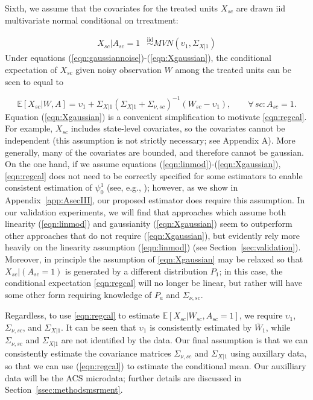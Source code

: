 \documentclass[aoas]{imsart}
\theoremstyle{plain}
\theoremstyle{remark}
\begin{document}
Sixth, we assume that the covariates for the treated units $X_{sc}$ are drawn iid multivariate normal conditional on trreatment:

\begin{align} \label{eqn:Xgaussian}
    X_{sc}|A_{sc} = 1 & \stackrel{\text{iid}}{\sim} MVN(\upsilon_1, \Sigma_{X|1})%
\end{align}
%
Under equations (\ref{eqn:gaussiannoise})-(\ref{eqn:Xgaussian}), the conditional expectation of $X_{sc}$ given noisy observation $W$ among the treated units can be seen to equal to

\begin{equation} \label{eqn:regcal}
\mathbb{E}[X_{sc}| W, A] = \upsilon_1 + \Sigma_{X|1} \left(\Sigma_{X|1} + \Sigma_{\nu, sc}\right)^{-1}  (W_{sc} - \upsilon_1), \qquad \forall\, sc: A_{sc} = 1.
\end{equation}
%
Equation (\ref{eqn:Xgaussian}) is a convenient simplification to motivate \eqref{eqn:regcal}. For example, $X_{sc}$ includes state-level covariates, so the covariates cannot be independent (this assumption is not strictly necessary; see Appendix A). More generally, many of the covariates are bounded, and therefore cannot be gaussian. On the one hand, if we assume equations (\ref{eqn:linmod})-(\ref{eqn:Xgaussian}), \eqref{eqn:regcal} does not need to be correctly specified for some estimators to enable consistent estimation of $\psi_0^1$ (see, e.g., \cite{gleser1992importance}); however, as we show in Appendix~\ref{app:AsecIII}, our proposed estimator does require this assumption. In our validation experiments, we will find that approaches which assume both linearity (\ref{eqn:linmod}) and gaussianity (\ref{eqn:Xgaussian}) seem to outperform other approaches that do not require (\ref{eqn:Xgaussian}), but evidently rely more heavily on the linearity assumption (\ref{eqn:linmod}) (see Section~\ref{sec:validation}). Moreover, in principle the assumption of \eqref{eqn:Xgaussian} may be relaxed so that $X_{sc}|(A_{sc}=1)$ is generated by a different distribution $P_1$; in this case, the conditional expectation \eqref{eqn:regcal} will no longer be linear, but rather will have some other form requiring knowledge of $P_a$ and $\Sigma_{\nu, sc}$.

Regardless, to use \eqref{eqn:regcal} to estimate $\mathbb{E}[X_{sc}|W_{sc}, A_{sc}=1]$, we require $\upsilon_1$, $\Sigma_{\nu,sc}$, and $\Sigma_{X|1}$. It can be seen that $\upsilon_1$ is consistently estimated by $\bar{W}_1$, while $\Sigma_{\nu,sc}$ and $\Sigma_{X|1}$ are not identified by the data. Our final assumption is that we can consistently estimate the covariance matrices $\Sigma_{\nu,sc}$ and $\Sigma_{X|1}$ using auxillary data, so that we can use (\ref{eqn:regcal}) to estimate the conditional mean. Our auxilliary data will be the ACS microdata; further details are discussed in Section~\ref{ssec:methodsmsrment}.
\end{document}
